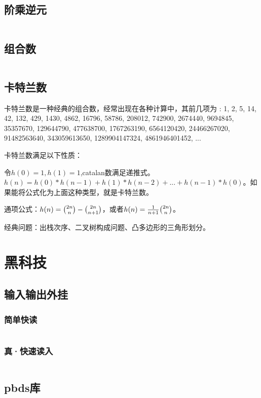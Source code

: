 \documentclass[a4paper,fleqn,11pt]{article}
\begin{document}
\subsection{阶乘逆元}
\inputminted[breaklines]{c++}{math/Fiv.cpp}

\subsection{组合数}
\inputminted[breaklines]{c++}{math/Combination.cpp}

\subsection{卡特兰数}

卡特兰数是一种经典的组合数，经常出现在各种计算中，其前几项为 : 1, 2, 5, 14, 42, 132, 429, 1430, 4862, 16796, 58786, 208012, 742900, 2674440, 9694845, 35357670, 129644790, 477638700, 1767263190, 6564120420, 24466267020, 91482563640, 343059613650, 1289904147324, 4861946401452, ...

卡特兰数满足以下性质：

令$h(0)=1,h(1)=1$,catalan数满足递推式。$h(n)=h(0)*h(n-1)+h(1)*h(n-2)+...+h(n-1)*h(0)$。如果能将公式化为上面这种类型，就是卡特兰数。

通项公式：$h(n) = \tbinom{2n}{n} -\tbinom{2n}{n+1}$，或者$h(n) = \frac{1}{n+1}\tbinom{2n}{n}$。

经典问题：出栈次序、二叉树构成问题、凸多边形的三角形划分。



\newpage
\section{黑科技}

\subsection{输入输出外挂}
\subsubsection{简单快读}
\inputminted[breaklines]{c++}{黑科技/QuickIO.cpp}
\subsubsection{真·快速读入}
\inputminted[breaklines]{c++}{黑科技/FastIO.cpp}

\subsection{pbds库}
\end{document}
